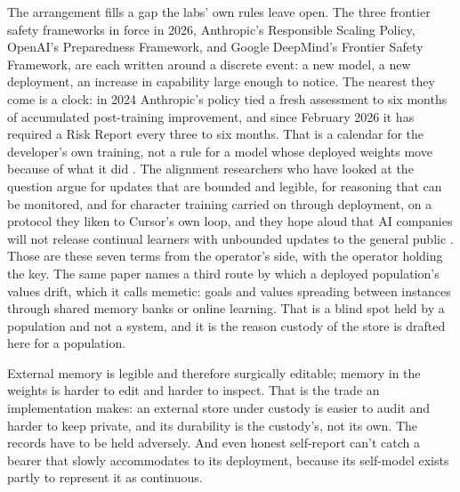 The arrangement fills a gap the labs' own rules leave open. The three frontier safety frameworks in force in 2026, Anthropic's Responsible Scaling Policy, OpenAI's Preparedness Framework, and Google DeepMind's Frontier Safety Framework, are each written around a discrete event: a new model, a new deployment, an increase in capability large enough to notice. The nearest they come is a clock: in 2024 Anthropic's policy tied a fresh assessment to six months of accumulated post-training improvement, and since February 2026 it has required a Risk Report every three to six months. That is a calendar for the developer's own training, not a rule for a model whose deployed weights move because of what it did \autocite{anthropic2024rsp2,anthropic2026rsp34,openai2025preparedness2,gdm2026fsf31}. The alignment researchers who have looked at the question argue for updates that are bounded and legible, for reasoning that can be monitored, and for character training carried on through deployment, on a protocol they liken to Cursor's own loop, and they hope aloud that AI companies will not release continual learners with unbounded updates to the general public \autocite{arike2026cl}. Those are these seven terms from the operator's side, with the operator holding the key. The same paper names a third route by which a deployed population's values drift, which it calls memetic: goals and values spreading between instances through shared memory banks or online learning. That is a blind spot held by a population and not a system, and it is the reason custody of the store is drafted here for a population.


External memory is legible and therefore surgically editable; memory in the weights is harder to edit and harder to inspect.
That is the trade an implementation makes: an external store under custody is easier to audit and harder to keep private, and its durability is the custody's, not its own. The records have to be held adversely. And even honest self-report can't catch a bearer that slowly accommodates to its deployment, because its self-model exists partly to represent it as continuous.

